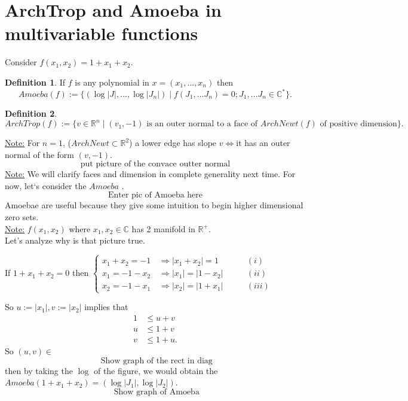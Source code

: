 \documentclass[]{article}
\theoremstyle{definition}
\newtheorem*{defn}{Definition}
\begin{document}
			\section{ArchTrop and Amoeba in multivariable functions}
			Consider $f(x_1,x_2)=1+x_1+x_2$.
			\begin{defn}
			If $f$ is any polynomial in $x=(x_1,\ldots,x_n)$ then 
			\[Amoeba(f):= \{(\log|J|,\ldots,\log|J_n|) \mid f(J_1,\dots J_n)=0; J_1,\dots J_n \in \mathbb{C}^{*} \}.\]
			\end{defn}
			\begin{defn}
			\[ArchTrop(f):= \{v\in \mathbb{R}^{n} \mid (v_1,-1) \text{ is an outer normal to a face of $ArchNewt(f)$ of positive dimension}\}.\]
			\end{defn}
			\underline{Note:} For $n=1$, ($ArchNewt \subset \mathbb{R}^{2}$) a lower edge has slope $v \iff$it has an outer normal of the form $			(v,-1)$.
			\[ \text{put picture of the convace outter normal}\]
			\underline{Note:} We will clarify faces and dimension in complete generality next time. For now, let`s consider the $Amoeba$ .
			\[ \text{Enter pic of Amoeba here}\]
			Amoebae are useful because they give some intuition to begin higher dimensional zero sets.\\
			\underline{Note:} $f(x_1,x_2)$ where $x_1,x_2 \in \mathbb{C}$ has 2 manifold in $\mathbb{R}^{+}$.\\
			Let's analyze why is that picture true.
			\begin{center}
			If $ 1+x_1+x_2=0$ then $\begin{cases}
			x_1+x_2=-1\quad \Rightarrow |x_1+x_2|=1 \qquad &(i) \\
			x_1=-1-x_2\quad \Rightarrow |x_1|=|1-x_2| \qquad &(ii)\\
			x_2=-1-x_1\quad \Rightarrow |x_2|=|1+x_1| \qquad &(iii)
			\end{cases}
			$
			\end{center}
			So $u:= |x_1|, v:=|x_2|$ implies that 
			\begin{align*}
				1 &\leq u+v \\
				u &\leq 1+v \\
				v &\leq 1+u.
			\end{align*}
			So $(u,v) \in $
			\[ \text{ Show graph  of the rect in diag}\]
			then by taking the $\log$ of the figure, we would obtain the $Amoeba(1+x_1+x_2)=(\log|J_1|,\log|J_2|)$.
						\[ \text{ Show graph  of Amoeba}\]
			
\end{document}
